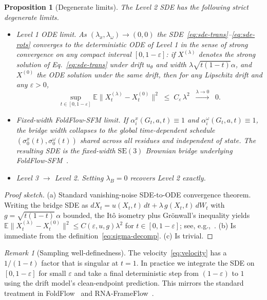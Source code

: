 \documentclass{article}
\newtheorem{proposition}{Proposition}
\theoremstyle{remark}
\newtheorem{remark}{Remark}
\theoremstyle{definition}
\newcommand{\E}{\mathbb{E}}
\newcommand{\SE}{\mathrm{SE}}
\begin{document}
\begin{proposition}[Degenerate limits]
\label{prop:degenerate}
The Level 2 SDE has the following strict degenerate limits.
\begin{itemize}[leftmargin=1.8em,itemsep=0pt]
\item[\textnormal{(a)}] \emph{Level 1 ODE limit.} As
$(\lambda_x,\lambda_\omega)\to(0,0)$ the SDE~\eqref{eq:sde-trans}--\eqref{eq:sde-rots}
converges to the deterministic ODE of Level 1 in the sense of strong
convergence on any compact interval $[0,1-\varepsilon]$: if $X^{(\lambda)}$
denotes the strong solution of Eq.~\eqref{eq:sde-trans} under drift $u_\theta$
and width $\lambda\sqrt{t(1-t)}\alpha$, and $X^{(0)}$ the ODE solution under
the same drift, then for any Lipschitz drift and any $\varepsilon>0$,
\[
\sup_{t\in[0,1-\varepsilon]}
  \E\big\|X^{(\lambda)}_t-X^{(0)}_t\big\|^2
  \;\leq\;C_\varepsilon\,\lambda^2\;\;\xrightarrow{\lambda\to 0}\;\;0.
\]
\item[\textnormal{(b)}] \emph{Fixed-width FoldFlow-SFM limit.} If
$\alpha^x_i(G_t,a,t)\equiv 1$ and $\alpha^\omega_i(G_t,a,t)\equiv 1$, the
bridge width collapses to the global time-dependent schedule
$(\sigma^x_0(t),\sigma^\omega_0(t))$ shared across all residues and
independent of state. The resulting SDE is the fixed-width $\SE(3)$ Brownian
bridge underlying FoldFlow-SFM~\citep{foldflow}.
\item[\textnormal{(c)}] \emph{Level 3 $\to$ Level 2.} Setting
$\lambda_B=0$ recovers Level 2 exactly.
\end{itemize}
\end{proposition}

\begin{proof}[Proof sketch]
(a) Standard vanishing-noise SDE-to-ODE convergence theorem. Writing the
bridge SDE as $dX_t=u(X_t,t)\,dt+\lambda\,g(X_t,t)\,dW_t$ with
$g=\sqrt{t(1-t)}\,\alpha$ bounded, the It\^o isometry plus Gr\"onwall's
inequality yields
$\E\|X^{(\lambda)}_t-X^{(0)}_t\|^2\leq C(\varepsilon,u,g)\lambda^2$ for
$t\in[0,1-\varepsilon]$; see, e.g.,~\citet[Ch.~5]{kloedenplaten1992}. (b) Is
immediate from the definition~\eqref{eq:sigma-decomp}. (c) Is trivial.
\end{proof}

\begin{remark}[Sampling well-definedness]
The velocity~\eqref{eq:velocity} has a $1/(1-t)$ factor that is singular at
$t=1$. In practice we integrate the SDE on $[0, 1-\varepsilon]$ for small
$\varepsilon$ and take a final deterministic step from
$(1-\varepsilon)$ to $1$ using the drift model's clean-endpoint prediction.
This mirrors the standard treatment in FoldFlow~\citep{foldflow} and
RNA-FrameFlow~\citep{rnaframeflow}.
\end{remark}
\end{document}
